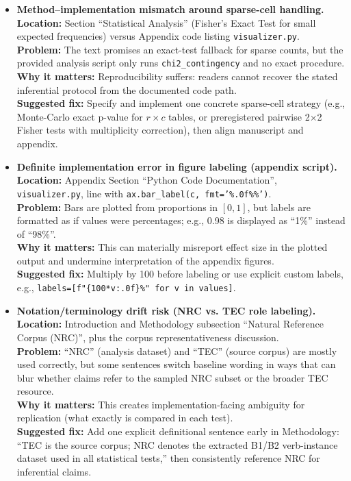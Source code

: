 \documentclass[11pt]{article}
\begin{document}
\begin{itemize}
\item \textbf{Method--implementation mismatch around sparse-cell handling.}\\
\textbf{Location:} Section ``Statistical Analysis'' (Fisher's Exact Test for small expected frequencies) versus Appendix code listing \texttt{visualizer.py}.\\
\textbf{Problem:} The text promises an exact-test fallback for sparse counts, but the provided analysis script only runs \texttt{chi2\_contingency} and no exact procedure.\\
\textbf{Why it matters:} Reproducibility suffers: readers cannot recover the stated inferential protocol from the documented code path.\\
\textbf{Suggested fix:} Specify and implement one concrete sparse-cell strategy (e.g., Monte-Carlo exact p-value for \(r\times c\) tables, or preregistered pairwise 2\(\times\)2 Fisher tests with multiplicity correction), then align manuscript and appendix.

\item \textbf{Definite implementation error in figure labeling (appendix script).}\\
\textbf{Location:} Appendix Section ``Python Code Documentation'', \texttt{visualizer.py}, line with \texttt{ax.bar\_label(c, fmt='\%.0f\%\%')}.\\
\textbf{Problem:} Bars are plotted from proportions in \([0,1]\), but labels are formatted as if values were percentages; e.g., 0.98 is displayed as ``1\%'' instead of ``98\%''.\\
\textbf{Why it matters:} This can materially misreport effect size in the plotted output and undermine interpretation of the appendix figures.\\
\textbf{Suggested fix:} Multiply by 100 before labeling or use explicit custom labels, e.g., \texttt{labels=[f"\{100*v:.0f\}\%" for v in values]}.

\item \textbf{Notation/terminology drift risk (NRC vs. TEC role labeling).}\\
\textbf{Location:} Introduction and Methodology subsection ``Natural Reference Corpus (NRC)'', plus the corpus representativeness discussion.\\
\textbf{Problem:} ``NRC'' (analysis dataset) and ``TEC'' (source corpus) are mostly used correctly, but some sentences switch baseline wording in ways that can blur whether claims refer to the sampled NRC subset or the broader TEC resource.\\
\textbf{Why it matters:} This creates implementation-facing ambiguity for replication (what exactly is compared in each test).\\
\textbf{Suggested fix:} Add one explicit definitional sentence early in Methodology: ``TEC is the source corpus; NRC denotes the extracted B1/B2 verb-instance dataset used in all statistical tests,'' then consistently reference NRC for inferential claims.

\end{itemize}
\end{document}
